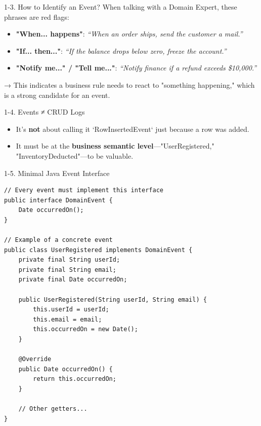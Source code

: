 \documentclass{beamer}
\begin{document}
\begin{frame}{1-3. How to Identify an Event?}
  When talking with a Domain Expert, these phrases are red flags:
  \begin{itemize}
    \item<1-> \textbf{"When... happens"}: \textit{“When an order ships, send the customer a mail.”}
    \item<2-> \textbf{"If... then..."}: \textit{“If the balance drops below zero, freeze the account.”}
    \item<3-> \textbf{"Notify me..." / "Tell me..."}: \textit{“Notify finance if a refund exceeds \$10,000.”}
  \end{itemize}
  \vfill
  \begin{alertblock}{}
    → This indicates a business rule needs to react to "something happening," which is a strong candidate for an event.
  \end{alertblock}
\end{frame}

\begin{frame}{1-4. Events ≠ CRUD Logs}
  \begin{itemize}
    \item It's \textbf{not} about calling it `RowInsertedEvent` just because a row was added.
    \item It must be at the \textbf{business semantic level}—"UserRegistered," "InventoryDeducted"—to be valuable.
  \end{itemize}
\end{frame}

\begin{frame}[fragile]{1-5. Minimal Java Event Interface}
  \begin{lstlisting}
// Every event must implement this interface
public interface DomainEvent {
    Date occurredOn();
}

// Example of a concrete event
public class UserRegistered implements DomainEvent {
    private final String userId;
    private final String email;
    private final Date occurredOn;

    public UserRegistered(String userId, String email) {
        this.userId = userId;
        this.email = email;
        this.occurredOn = new Date();
    }

    @Override
    public Date occurredOn() {
        return this.occurredOn;
    }
    
    // Other getters...
}
  \end{lstlisting}
\end{frame}
\end{document}
